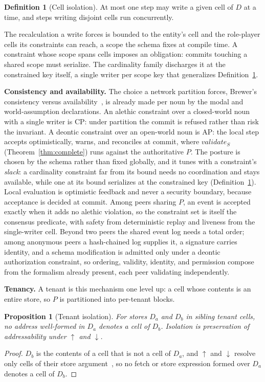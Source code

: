 \documentclass[10pt,twocolumn]{article}
\theoremstyle{plain}
\newtheorem{proposition}{Proposition}
\theoremstyle{definition}
\newtheorem{definition}{Definition}
\begin{document}
\begin{definition}[Cell isolation]\label{def:iso}
At most one step may write a given cell of $D$ at a time, and steps writing disjoint cells run concurrently.
\end{definition}

\noindent The recalculation a write forces is bounded to the entity's cell and the role-player cells its constraints can reach, a scope the schema fixes at compile time. A constraint whose scope spans cells imposes an obligation: commits touching a shared scope must serialize. The cardinality family discharges it at the constrained key itself, a single writer per scope key that generalizes Definition~\ref{def:iso}.

\smallskip\noindent\textbf{Consistency and availability.} The choice a network partition forces, Brewer's consistency versus availability~\cite{gilbert02}, is already made per noun by the modal and world-assumption declarations. An alethic constraint over a closed-world noun with a single writer is CP: under partition the commit is refused rather than risk the invariant. A deontic constraint over an open-world noun is AP: the local step accepts optimistically, warns, and reconciles at commit, where $\mathit{validate}_S$ (Theorem~\ref{thm:complete}) runs against the authoritative $P$. The posture is chosen by the schema rather than fixed globally, and it tunes with a constraint's \emph{slack}: a cardinality constraint far from its bound needs no coordination and stays available, while one at its bound serializes at the constrained key (Definition~\ref{def:iso}). Local evaluation is optimistic feedback and never a security boundary, because acceptance is decided at commit. Among peers sharing $P$, an event is accepted exactly when it adds no alethic violation, so the constraint set is itself the consensus predicate, with safety from deterministic replay and liveness from the single-writer cell. Beyond two peers the shared event log needs a total order; among anonymous peers a hash-chained log supplies it, a signature carries identity, and a schema modification is admitted only under a deontic authorization constraint, so ordering, validity, identity, and permission compose from the formalism already present, each peer validating independently.

\smallskip\noindent\textbf{Tenancy.} A tenant is this mechanism one level up: a cell whose contents is an entire store, so $P$ is partitioned into per-tenant blocks.

\begin{proposition}[Tenant isolation]\label{prop:tenant}
For stores $D_a$ and $D_b$ in sibling tenant cells, no address well-formed in $D_a$ denotes a cell of $D_b$. Isolation is preservation of addressability under $\uparrow$ and $\downarrow$.
\end{proposition}
\begin{proof}
$D_b$ is the contents of a cell that is not a cell of $D_a$, and $\uparrow$ and $\downarrow$ resolve only cells of their store argument~\cite[Secs.\,13.3.4,\,14.3]{backus78}, so no fetch or store expression formed over $D_a$ denotes a cell of $D_b$.
\end{proof}
\end{document}
